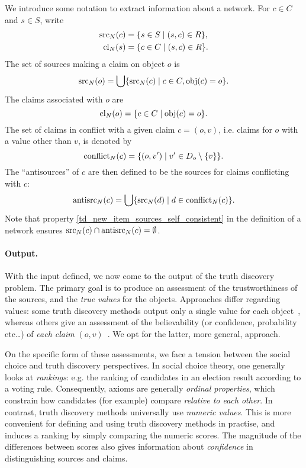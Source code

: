 We introduce some notation to extract information about a network. For $c \in
C$ and $s \in S$, write
\begin{align*}
    \operatorname{src}_N(c) &= \{s \in S \mid (s, c) \in R\},\\
    \operatorname{cl}_N(s) &= \{c \in C \mid (s, c) \in R\}.
\end{align*}
The set of sources making a claim on object $o$ is
\[
    \operatorname{src}_N(o) = \bigcup\{\operatorname{src}_N(c) \mid c \in C, \operatorname{obj}(c) = o\}.
\]
The claims associated with $o$ are
\[
    \operatorname{cl}_N(o) = \{c \in C \mid \operatorname{obj}(c) = o\}.
\]
The set of claims in conflict with a given claim $c = (o, v)$, i.e.  claims for
$o$ with a value other than $v$, is denoted by
\[
    \operatorname{conflict}_N(c) = \{(o, v') \mid v' \in D_o \setminus \{v\}\}.
\]
The ``antisources'' of $c$ are then defined to be the sources for claims
conflicting with $c$:
\[
    \operatorname{antisrc}_N(c) = \bigcup\{\operatorname{src}_N(d) \mid d \in \operatorname{conflict}_N(c)\}.
\]
Note that property \cref{td_new_item_sources_self_consistent} in the definition
of a network ensures $\operatorname{src}_N(c) \cap \operatorname{antisrc}_N(c) = \emptyset$.

\paragraph{Output.}

With the input defined, we now come to the output of the truth discovery
problem.
The primary goal is to produce an assessment of the trustworthiness of the
sources, and the \emph{true values} for the objects. Approaches differ
regarding values: some truth discovery methods output only a single value for
each object~\cite{li2016,ding_finding_2016,yang_continuous_2018}, whereas
others give an assessment of the believability (or confidence, probability
etc\ldots) of \emph{each claim} $(o,
v)$~\cite{yin2008,pasternack2010,galland2010,zhi2015,zhang_robust_2016,zhang2018}.
We opt for the latter, more general, approach.

On the specific form of these assessments, we face a tension between the social
choice and truth discovery perspectives. In social choice theory, one generally
looks at \emph{rankings}: e.g. the ranking of candidates in an election result
according to a voting rule. Consequently, axioms are generally \emph{ordinal
properties}, which constrain how candidates (for example) compare
\emph{relative to each other}. In contrast, truth discovery methods universally
use \emph{numeric values}. This is more convenient for defining and using truth
discovery methods in practise, and induces a ranking by simply comparing the
numeric scores. The magnitude of the differences between scores also gives
information about \emph{confidence} in distinguishing sources and claims.

